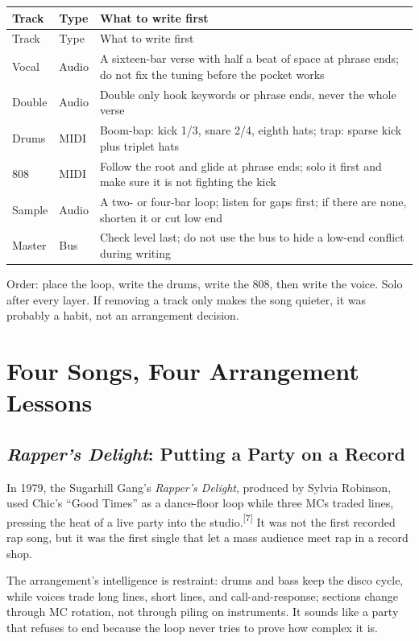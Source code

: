 \begin{longtable}{p{}p{}p{}}
\toprule
Track & Type & What to write first \\
\midrule
\endfirsthead
\toprule
Track & Type & What to write first \\
\midrule
\endhead
Vocal & Audio & A sixteen-bar verse with half a beat of space at phrase ends; do not fix the tuning before the pocket works \\
Double & Audio & Double only hook keywords or phrase ends, never the whole verse \\
Drums & MIDI & Boom-bap: kick 1/3, snare 2/4, eighth hats; trap: sparse kick plus triplet hats \\
808 & MIDI & Follow the root and glide at phrase ends; solo it first and make sure it is not fighting the kick \\
Sample & Audio & A two- or four-bar loop; listen for gaps first; if there are none, shorten it or cut low end \\
Master & Bus & Check level last; do not use the bus to hide a low-end conflict during writing \\
\bottomrule
\end{longtable}

Order: place the loop, write the drums, write the 808, then write the voice. Solo after every layer. If removing a track only makes the song quieter, it was probably a habit, not an arrangement decision.

\section{Four Songs, Four Arrangement Lessons}
\label{sec:hiphop-cases}

\subsection{\emph{Rapper's Delight}: Putting a Party on a Record}
\label{sec:hiphop-case-rappers-delight}

In 1979, the Sugarhill Gang's \emph{Rapper's Delight}, produced by Sylvia Robinson, used Chic's ``Good Times'' as a dance-floor loop while three MCs traded lines, pressing the heat of a live party into the studio.{\textsuperscript{[7]}} It was not the first recorded rap song, but it was the first single that let a mass audience meet rap in a record shop.

The arrangement's intelligence is restraint: drums and bass keep the disco cycle, while voices trade long lines, short lines, and call-and-response; sections change through MC rotation, not through piling on instruments. It sounds like a party that refuses to end because the loop never tries to prove how complex it is.

